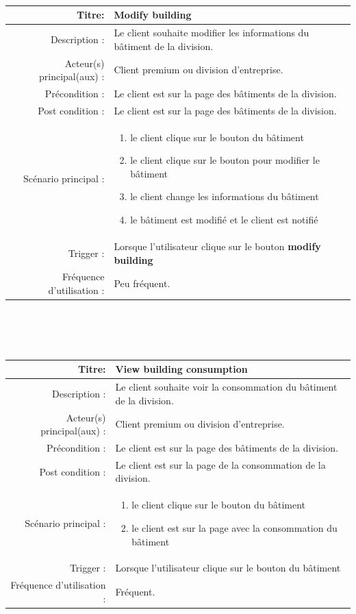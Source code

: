 \documentclass{report}
\begin{document}
\\\\\\
\begin{tabular}{|r|p{9cm}|}
    \hline
    Titre: & Modify building \\
    \hline
    Description : & Le client souhaite modifier les informations du bâtiment de la division. \\
    \hline
    Acteur(s) principal(aux) : & Client premium ou division d'entreprise. \\
    \hline
    Précondition : & Le client est sur la page des bâtiments de la division. \\
    \hline
    Post condition : & Le client est sur la page des bâtiments de la division. \\
    \hline
    Scénario principal : & \begin{enumerate}[left=0pt, topsep=0pt]
        \item le client clique sur le bouton du bâtiment
        \item le client clique sur le bouton pour modifier le bâtiment
        \item le client change les informations du bâtiment
        \item le bâtiment est modifié et le client est notifié 
    \end{enumerate} \nointerlineskip\\
    \hline
    Trigger : & Lorsque l'utilisateur clique sur le bouton \textbf{modify building} \\ 
    \hline
    Fréquence d'utilisation : & Peu fréquent. \\
    \hline
\end{tabular}
\\\\\\
\begin{tabular}{|r|p{9cm}|}
    \hline
    Titre: & View building consumption \\
    \hline
    Description : & Le client souhaite voir la consommation du bâtiment de la division. \\
    \hline
    Acteur(s) principal(aux) : & Client premium ou division d'entreprise. \\
    \hline
    Précondition : & Le client est sur la page des bâtiments de la division. \\
    \hline
    Post condition : & Le client est sur la page de la consommation de la division. \\
    \hline
    Scénario principal : & \begin{enumerate}[left=0pt, topsep=0pt]
        \item le client clique sur le bouton du bâtiment
        \item le client est sur la page avec la consommation du bâtiment
    \end{enumerate} \nointerlineskip\\
    \hline
    Trigger : & Lorsque l'utilisateur clique sur le bouton du bâtiment \\ 
    \hline
    Fréquence d'utilisation : & Fréquent. \\
    \hline
\end{tabular}
\end{document}
